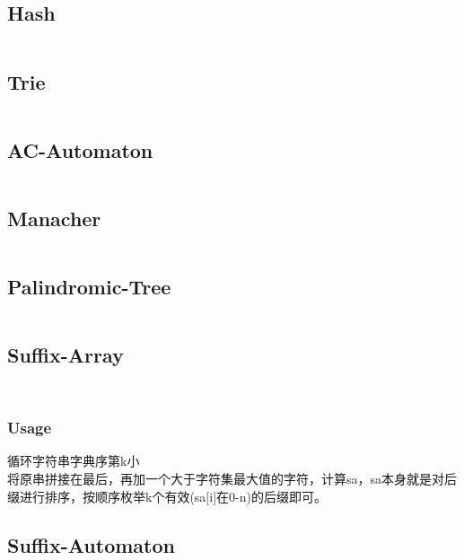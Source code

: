 \documentclass[a4paper,12pt]{article}
\begin{document}
\subsection{Hash}
\inputminted[]{c++}{Template/String/hash.cpp}
\subsection{Trie}
\inputminted[]{c++}{Template/String/trie.cpp}
\subsection{AC-Automaton}
\inputminted[]{c++}{Template/String/acm.cpp}
\subsection{Manacher}
\inputminted[]{c++}{Template/String/manacher.cpp}
\subsection{Palindromic-Tree}
\inputminted[]{c++}{Template/String/pt.cpp}
\subsection{Suffix-Array}
\inputminted[]{c++}{Template/String/sa.cpp}
\inputminted[]{c++}{Template/String/sa-dc3.cpp}
\subsubsection{Usage}
\begin{framed}
	 循环字符串字典序第k小
	\\ 将原串拼接在最后，再加一个大于字符集最大值的字符，计算sa，sa本身就是对后缀进行排序，按顺序枚举k个有效(sa[i]在0-n)的后缀即可。
\end{framed}
\subsection{Suffix-Automaton}
\inputminted[]{c++}{Template/String/sam.cpp}
\end{document}
